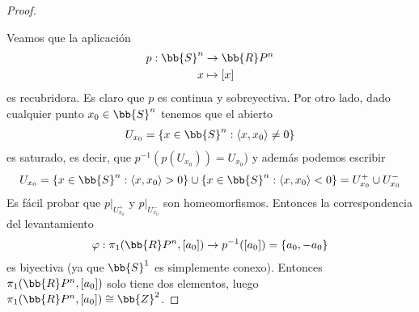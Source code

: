 \begin{coro}
\begin{proof}
\begin{figure}[H]
        \end{figure}

        Veamos que la aplicación
        \begin{align*}
            p: \bb{S}^n & \to \bb{R}P^n\\
            x & \mapsto [x]
        \end{align*}
        es recubridora. Es claro que $p$ es continua y sobreyectiva. Por otro lado, dado cualquier punto $x_0\in \bb{S}^n$ tenemos que el abierto
        \begin{gather*}
            U_{x_0} = \{x\in \bb{S}^n : \langle x, x_0 \rangle \neq 0\}
        \end{gather*}
        es saturado, es decir, que $p^{-1}(p(U_{x_0})) = U_{x_0}$) y además podemos escribir
        \begin{gather*}
            U_{x_0} = \{x\in \bb{S}^n : \langle x, x_0 \rangle > 0\} \cup \{x\in \bb{S}^n : \langle x, x_0 \rangle < 0\} = U_{x_0}^+ \cup U_{x_0}^-
        \end{gather*}
        Es fácil probar que $p|_{U_{x_0}^+}$ y $p|_{U_{x_0}^-}$ son homeomorfismos. Entonces la correspondencia del levantamiento
        \begin{gather*}
            \varphi: \pi_1(\bb{R}P^n, [a_0]) \to p^{-1}([a_0]) = \{a_0,-a_0\}
        \end{gather*}
        es biyectiva (ya que $\bb{S}^1$ es simplemente conexo). Entonces $\pi_1(\bb{R}P^n, [a_0])$ solo tiene dos elementos, luego $\pi_1(\bb{R}P^n, [a_0]) \cong \bb{Z}^2$.
    \end{proof}
\end{coro}

